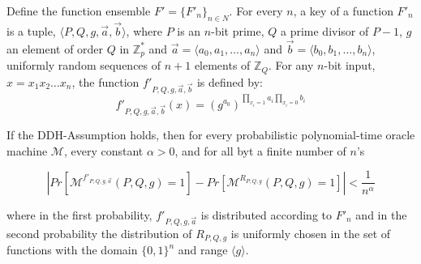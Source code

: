 \begin{construction}
\label{const:newprf}
Define the function ensemble $F' = \{F'_n\}_{n\in N}$.  For every $n$, a key of a function $F'_n$ is a tuple, $\langle P,Q,g,\vec{a},\vec{b}\rangle$, 
where $P$ is an $n$-bit prime, $Q$ a prime divisor of $P-1$, $g$ an element of order $Q$ in $\mathbb{Z}_{p}^*$ and $\vec{a}=\langle 
a_0,a_1, \ldots , a_n \rangle$ and $\vec{b}=\langle 
b_0,b_1, \ldots ,b_n \rangle$, uniformly random sequences of $n+1$ elements of $\mathbb{Z}_Q$.  For any $n$-bit input, $x=x_1 x_2 \ldots x_n$, the 
function $f'_{P,Q,g,\vec{a},\vec{b}}$ is defined by:
 $$f'_{P,Q,g,\vec{a},\vec{b}}(x) = (g^{a_0})^{\prod_{x_i=1}a_i \prod_{x_i=0}b_i}$$
 \end{construction}
 
\begin{theorem}
\label{theorem:newprf}

If the DDH-Assumption holds, then for every probabilistic polynomial-time oracle machine $\mathcal{M}$, every constant $\alpha > 0$, and for all byt a finite number of $n$'s

$$| Pr[\mathcal{M}^{f'_{P,Q,g,\vec{a}}}(P,Q,g)=1] - Pr[\mathcal{M}^{R_{P,Q,g}}(P,Q,g) = 1]| < \frac{1}{n^\alpha} $$

where in the first probability, $f'_{P,Q,g,\vec{a}}$ is distributed according to $F'_n$ and in the second probability the distribution of $R_{P,Q,g}$ is uniformly chosen in the set of functions with the domain $\{0,1\}^n$ and range $\langle g\rangle$.
\end{theorem}

